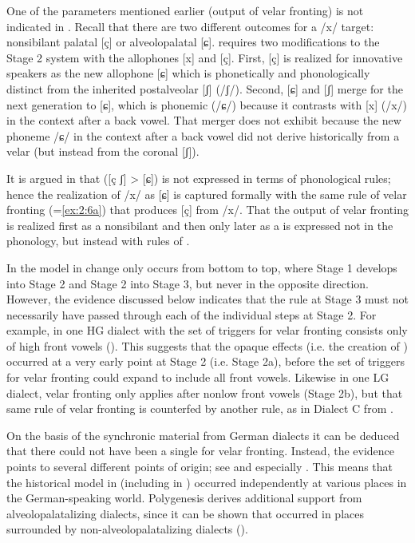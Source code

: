 \begin{xlist}
\begin{xlist}
One of the parameters mentioned earlier (output of velar fronting) is not indicated in . Recall that there are two different outcomes for a /x/ target: nonsibilant palatal [ç] or  alveolopalatal [ɕ].  requires two modifications to the Stage 2 system with the allophones [x] and [ç]. First, [ç] is realized for innovative speakers as the new allophone [ɕ] which is phonetically and phonologically distinct from the inherited postalveolar [ʃ] (/ʃ/). Second, [ɕ] and [ʃ] merge for the next generation to [ɕ], which is phonemic (/ɕ/) because it contrasts with [x] (/x/) in the context after a back vowel. That merger does not exhibit  because the new phoneme /ɕ/ in the context after a back vowel did not derive historically from a velar (but instead from the coronal [ʃ]).

It is argued in  that  ([ç ʃ] > [ɕ]) is not expressed in terms of phonological rules; hence the realization of /x/ as [ɕ] is captured formally with the same rule of velar fronting (=\ref{ex:2:6a}) that produces [ç] from /x/. That the output of velar fronting is realized first as a nonsibilant and then only later as a  is expressed not in the phonology, but instead with rules of .

In the model in  change only occurs from bottom to top, where Stage 1 develops into Stage 2 and Stage 2 into Stage 3, but never in the opposite direction. However, the evidence discussed below indicates that the rule at Stage 3 must not necessarily have passed through each of the individual steps at Stage 2. For example, in one HG dialect with  the set of triggers for velar fronting consists only of high front vowels (). This suggests that the opaque effects (i.e. the creation of ) occurred at a very early point at Stage 2 (i.e. Stage 2a), before the set of triggers for velar fronting could expand to include all front vowels. Likewise in one LG dialect, velar fronting only applies after nonlow front vowels (Stage 2b), but that same rule of velar fronting is counterfed by another rule, as in Dialect C from .

On the basis of the synchronic material from German dialects it can be deduced that there could not have been a single  for velar fronting. Instead, the evidence points to several different points of origin; see  and especially . This means that the historical model in  (including  in ) occurred independently at various places in the German-speaking world. Polygenesis derives additional support from alveolopalatalizing dialects, since it can be shown that  occurred in places surrounded by non-alveolopalatalizing dialects ().


\end{xlist}
\end{xlist}
